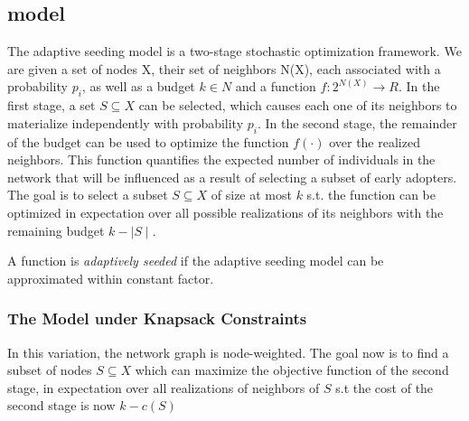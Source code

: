 \subsection{model}\label{sec:model}
The adaptive seeding model is a two-stage stochastic optimization framework. We are given a set of nodes {X}, their set of neighbors {N(X)},  each associated with a probability $p_i$, as well as a budget $k \in N$ and a function $f:2^{N(X)} \rightarrow R$.  In the first stage, a set $S \subseteq X$ can be selected, which causes each one of its neighbors to materialize independently with probability $p_i$. In the second stage, the remainder of the budget can be used to optimize the function $f \left( \cdot \right)$ over the realized neighbors. This function quantifies the expected number of individuals in the network that will be influenced as a result of selecting a subset of early adopters. The goal is to select a subset $S \subseteq X$ of size at most $k$ s.t. the function can be optimized in expectation over all possible realizations of its neighbors with the remaining budget $k - \mid S \mid$.

A function is \textit{adaptively seeded} if the adaptive seeding model can be approximated within constant factor.



\subsubsection{The Model under Knapsack Constraints}
In this variation, the network graph is node-weighted. The goal now is to find a subset of nodes $S \subseteq X$ which can maximize the objective function of the
second stage, in expectation over all realizations of neighbors of $S$ s.t the cost of the second stage is now $k - c(S)$

